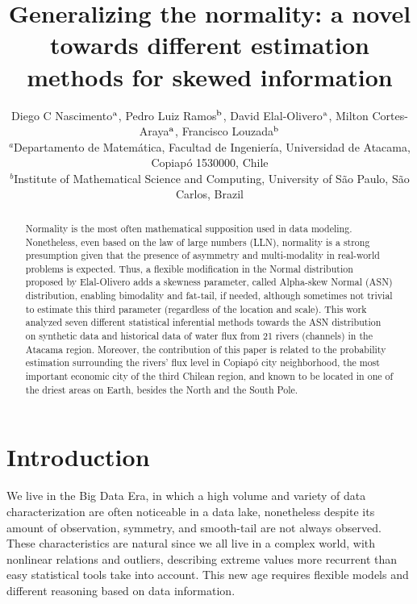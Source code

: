 \documentclass[]{interact}
\theoremstyle{plain}%
\theoremstyle{definition}
\theoremstyle{remark}
\begin{document}

\title{Generalizing the normality: a novel towards different estimation methods for skewed information}

\author{ Diego C Nascimento$^{\rm a}$, Pedro Luiz Ramos$^{\rm b}$, David Elal-Olivero$^{\rm a}$, Milton Cortes-Araya$^{\rm a}$, Francisco Louzada$^{\rm b}$ \\ $^{a}${Departamento de Matemática, Facultad de Ingeniería, Universidad de Atacama, Copiapó 1530000, Chile} \\ $^{b}${Institute of Mathematical Science and Computing, University of S\~ao Paulo, S\~ao Carlos, Brazil}}


\maketitle

\begin{abstract}
Normality is the most often mathematical supposition used in data modeling. Nonetheless, even based on the law of large numbers (LLN), normality is a strong presumption given that the presence of asymmetry and multi-modality in real-world problems is expected. Thus, a flexible modification in the Normal distribution proposed by Elal-Olivero \cite{elal2010alpha} adds a skewness parameter, called Alpha-skew Normal (ASN) distribution, enabling bimodality and fat-tail, if needed, although sometimes not trivial to estimate this third parameter (regardless of the location and scale). This work analyzed seven different statistical inferential methods towards the ASN distribution on synthetic data and historical data of water flux from 21 rivers (channels) in the Atacama region. Moreover, the contribution of this paper is related to the probability estimation surrounding the rivers' flux level in Copiapó city neighborhood, the most important economic city of the third Chilean region, and known to be located in one of the driest areas on Earth, besides the North and the South Pole.

\end{abstract}

\section{Introduction}
We live in the Big Data Era, in which a high volume and variety of data characterization are often noticeable in a data lake, nonetheless despite its amount of observation, symmetry, and smooth-tail are not always observed. These characteristics are natural since we all live in a complex world, with nonlinear relations and outliers, describing extreme values more recurrent than easy statistical tools take into account. This new age requires flexible models and different reasoning based on data information.
\end{document}
